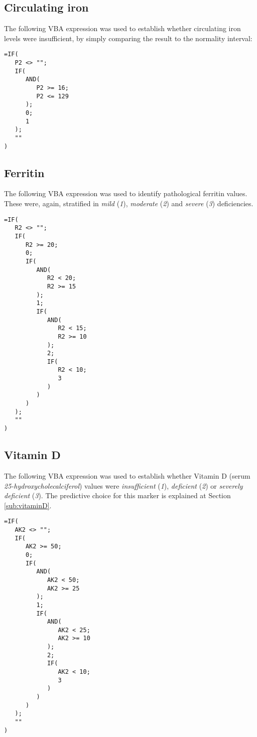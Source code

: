 \subsection{Circulating iron}\label{asub:patiron}
The following VBA expression was used to establish whether circulating iron levels were insufficient, by simply comparing the result to the normality interval:

\begin{minipage}{\linewidth}
\begin{lstlisting}
=IF(
   P2 <> "";
   IF(
      AND(
         P2 >= 16;
         P2 <= 129
      );
      0;
      1
   );
   ""
)
\end{lstlisting}
\end{minipage}

\subsection{Ferritin}\label{asub:patferritin}
The following VBA expression was used to identify pathological ferritin values. These were, again, stratified in \textit{mild} (\textit{1}), \textit{moderate} (\textit{2}) and \textit{severe} (\textit{3}) deficiencies.

\begin{lstlisting}
=IF(
   R2 <> "";
   IF(
      R2 >= 20;
      0;
      IF(
         AND(
            R2 < 20;
            R2 >= 15
         );
         1;
         IF(
            AND(
               R2 < 15;
               R2 >= 10
            );
            2;
            IF(
               R2 < 10;
               3
            )
         )
      )
   );
   ""
)
\end{lstlisting}

\subsection{Vitamin D}\label{asub:patvitaminD}
The following VBA expression was used to establish whether Vitamin D (serum \textit{25-hydroxycholecalciferol}) values were \textit{insufficient} (\textit{1}), \textit{deficient} (\textit{2}) or \textit{severely deficient} (\textit{3}). The predictive choice for this marker is explained at Section \ref{sub:vitaminD}.

\begin{lstlisting}
=IF(
   AK2 <> "";
   IF(
      AK2 >= 50;
      0;
      IF(
         AND(
            AK2 < 50;
            AK2 >= 25
         );
         1;
         IF(
            AND(
               AK2 < 25;
               AK2 >= 10
            );
            2;
            IF(
               AK2 < 10;
               3
            )
         )
      )
   );
   ""
)
\end{lstlisting}

